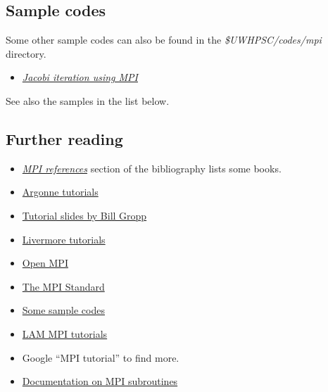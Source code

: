 \documentclass[letterpaper,10pt,english]{sphinxmanual}
\begin{document}
\subsection{Sample codes}
\label{mpi:sample-codes}
Some other sample codes can also be found in the \emph{\$UWHPSC/codes/mpi} directory.
\begin{itemize}
\item {} 
{\hyperref[jacobi1d_mpi:jacobi1d-mpi]{\emph{Jacobi iteration using MPI}}}

\end{itemize}

See also the samples in the list below.


\subsection{Further reading}
\label{mpi:further-reading}\begin{itemize}
\item {} 
{\hyperref[biblio:biblio-mpi]{\emph{MPI references}}} section of the bibliography lists some books.

\item {} 
\href{http://www.mcs.anl.gov/research/projects/mpi/tutorial/}{Argonne tutorials}

\item {} 
\href{http://www.mcs.anl.gov/research/projects/mpi/tutorial/gropp/talk.html}{Tutorial slides by Bill Gropp}

\item {} 
\href{https://computing.llnl.gov/tutorials/mpi/}{Livermore tutorials}

\item {} 
\href{http://www.open-mpi.org/}{Open MPI}

\item {} 
\href{http://www.mcs.anl.gov/research/projects/mpi/}{The MPI Standard}

\item {} 
\href{http://www.mcs.anl.gov/research/projects/mpi/usingmpi/examples/simplempi/main.htm}{Some sample codes}

\item {} 
\href{http://www.lam-mpi.org/tutorials/}{LAM MPI tutorials}

\item {} 
Google ``MPI tutorial'' to find more.

\item {} 
\href{http://www.mcs.anl.gov/research/projects/mpi/www/www3/}{Documentation on MPI subroutines}

\end{itemize}
\end{document}
